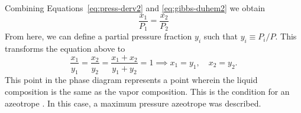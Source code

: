 Combining Equations~\ref{eq:press-derv2} and \ref{eq:gibbs-duhem2} we obtain
\[
    \dfrac{x_1}{P_1} = \dfrac{x_2}{P_2}
\]
From here, we can define a partial pressure fraction $y_i$ such that $y_i
\equiv P_i/P$. This transforms the equation above to
\begin{equation}\label{eq:azeotrope}
    \dfrac{x_1}{y_1} = \dfrac{x_2}{y_2} = \dfrac{x_1 + x_2}{y_1 + y_2} = 1
    \implies x_1 = y_1,\quad x_2 = y_2.
\end{equation}
This point in the phase diagram represents a point wherein the liquid
composition is the same as the vapor composition. This is the condition
for an azeotrope \cite[p.~394]{enggbook}. 
In this case, a maximum pressure azeotrope was described.
